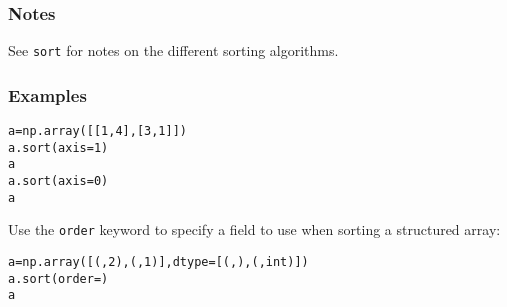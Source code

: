 \begin{boxedminipage}{\textwidth}

\hypertarget{notes}{}
\subsubsection*{Notes}

See \texttt{sort} for notes on the different sorting algorithms.



\hypertarget{examples}{}
\subsubsection*{Examples}
\begin{alltt}
\pysrcprompt{{\textgreater}{\textgreater}{\textgreater} }a = np.array([[1,4], [3,1]])
\pysrcprompt{{\textgreater}{\textgreater}{\textgreater} }a.sort(axis=1)
\pysrcprompt{{\textgreater}{\textgreater}{\textgreater} }a
\pysrcoutput{array([[1, 4],}
\pysrcoutput{       [1, 3]])}
\pysrcoutput{}\pysrcprompt{{\textgreater}{\textgreater}{\textgreater} }a.sort(axis=0)
\pysrcprompt{{\textgreater}{\textgreater}{\textgreater} }a
\pysrcoutput{array([[1, 3],}
\pysrcoutput{       [1, 4]])}\end{alltt}

Use the \texttt{order} keyword to specify a field to use when sorting a
structured array:
\begin{alltt}
\pysrcprompt{{\textgreater}{\textgreater}{\textgreater} }a = np.array([(, 2), (, 1)], dtype=[(, ), (, int)])
\pysrcprompt{{\textgreater}{\textgreater}{\textgreater} }a.sort(order=)
\pysrcprompt{{\textgreater}{\textgreater}{\textgreater} }a
\end{alltt}
    \vspace{1ex}

    \end{boxedminipage}

    \label{numpy:ndarray:squeeze}

    \vspace{0.5ex}

